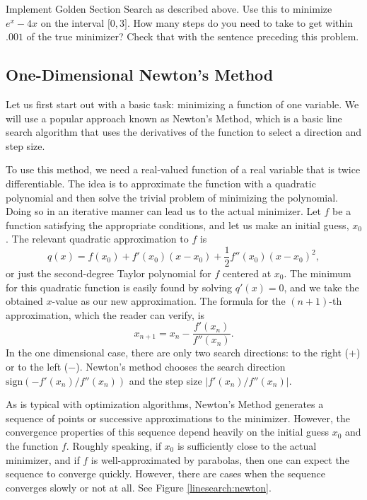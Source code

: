 \begin{problem}
Implement Golden Section Search as described above. Use this to minimize $e^x - 4x$
on the interval $\lbrack 0, 3 \rbrack$. How many steps do you need to take to get
within $.001$ of the true minimizer? Check that with the sentence preceding this
problem.
\end{problem}

\subsection*{One-Dimensional Newton's Method}
Let us first start out with a basic task: minimizing a function of one variable.
We will use a popular approach known as Newton's Method, which is a basic line search
algorithm that uses the derivatives of the function to select a direction and
step size.

To use this method, we need a real-valued function of a real variable that is twice
differentiable. The idea is to approximate the function with a quadratic polynomial and
then solve the trivial problem of minimizing the polynomial. Doing so in an iterative
manner can lead us to the actual minimizer. Let $f$ be a function satisfying the
appropriate conditions, and let us make an initial guess, $x_0$. The relevant quadratic
approximation to $f$ is
\begin{equation*}
q(x) = f(x_0) + f'(x_0)(x-x_0) + \frac{1}{2}f''(x_0)(x-x_0)^2,
\end{equation*}
or just the second-degree Taylor polynomial for $f$ centered at $x_0$. The minimum
for this quadratic function is easily found by solving $q'(x) = 0$, and we take the
obtained $x$-value as our new approximation. The formula for the $(n+1)$-th
approximation, which the reader can verify, is
\begin{equation*}
x_{n+1} = x_n - \frac{f'(x_n)}{f''(x_n)}.
\end{equation*}
In the one dimensional case, there are only two search directions: to the right ($+$)
or to the left ($-$). Newton's method chooses the search direction 
$\text{sign}(-f'(x_n)/f''(x_n))$ and the step size $|f'(x_n)/f''(x_n)|$.

As is typical with optimization algorithms, Newton's Method generates a sequence of
points or successive approximations to the minimizer. However, the convergence
properties of this sequence depend heavily on the initial guess $x_0$ and the function
$f$. Roughly speaking, if $x_0$ is sufficiently close to the actual minimizer, and if
$f$ is well-approximated by parabolas, then one can expect the sequence to converge
quickly. However, there are cases when the sequence converges slowly or not at all.
See Figure \ref{linesearch:newton}.


